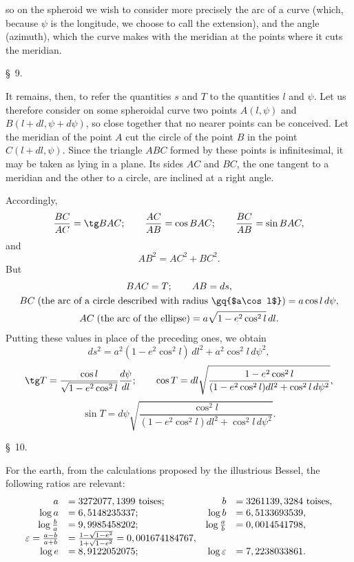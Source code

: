 so on the spheroid we wish to consider more precisely the arc  of a curve (which, because $\psi$ is the longitude, we choose to call the extension), and the angle  (azimuth), which the curve makes with the meridian at the points where it cuts the meridian.

\begin{center}\S\ 9.\end{center}
It remains, then, to refer the quantities $s$ and $T$ to the quantities $l$ and $\psi$. Let us therefore consider on some spheroidal curve two points $A(l,\psi)$ and $B(l+dl,\psi+d\psi)$, so close together that no nearer points can be conceived. Let the meridian of the point $A$ cut the circle of the point $B$ in the point $C(l+dl,\psi)$. Since the triangle $ABC$ formed by these points is infinitesimal, it may be taken as lying in a plane. Its sides $AC$ and $BC$, the one tangent to a meridian and the other to a circle, are inclined at a right angle.

Accordingly,
\[
 {BC\over AC}=\tg BAC;\qquad {AC\over AB}=\cos BAC;\qquad {BC\over AB}=\sin BAC,
\]
and
\[
  AB^2=AC^2+BC^2.
\]
But
\[
\begin{gathered}
 BAC=T;\qquad AB=ds,\\
 BC\;\hbox{(the arc of a circle described with radius \gq{$a\cos l$})}=a\cos l\,d\psi,\\
 AC\;\hbox{(the arc of the ellipse)}=a\sqrt{1-e^2\cos^2 l}\,dl.
\end{gathered}
\]
Putting these values in place of the preceding ones, we obtain
\[
 ds^2=a^2(1-e^2\cos^2l)\,dl^2+a^2\cos^2l\,d\psi^2,
\]
\[
\tg T={\cos l\over\sqrt{1-e^2\cos^2l}}{d\psi\over dl};\qquad
\cos T=dl\sqrt{\frac{1-e^2\cos^2l}{(1-e^2\cos^2l)dl^2+\cos^2l\,d\psi^2}},
\]
\[
\sin T=d\psi\sqrt{\frac{\cos^2l}{(1-e^2\cos^2l)dl^2+\cos^2l\,d\psi^2}}.
\]

\begin{center}\S\ 10.\end{center}
For the earth, from the calculations proposed by the illustrious Bessel, the following ratios are relevant:
\[
\begin{array}{rlrl}
 a&=3272077,1399\ \hbox{toises}; & b&=3261139,3284\ \hbox{toises},\\
 \log a&=6,5148235337; & \log b&=6,5133693539,\\
 \log {b\over a}&=9,9985458202; & \log {a\over b}&=0,0014541798,\\
 \varepsilon={a-b\over a+b}&={1-\sqrt{1-e^2}\over 1+\sqrt{1-e^2}}=0,001674184767,\\
 \log e&=8,9122052075; & \log\varepsilon&=7,2238033861.
\end{array}
\]
